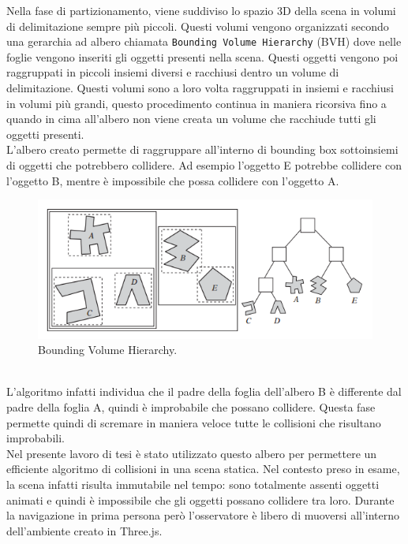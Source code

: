 Nella fase di partizionamento, viene suddiviso lo spazio 3D della scena in volumi di delimitazione sempre più piccoli. Questi volumi vengono organizzati secondo una gerarchia ad albero chiamata \texttt{Bounding Volume Hierarchy} (BVH) dove nelle foglie vengono inseriti gli oggetti presenti nella scena. 
Questi oggetti vengono poi raggruppati in piccoli insiemi diversi e racchiusi dentro un volume di delimitazione. Questi volumi sono a loro volta raggruppati in insiemi e racchiusi in volumi più grandi, questo procedimento continua in maniera ricorsiva fino a quando in cima all’albero non viene creata un volume che racchiude tutti gli oggetti presenti.
\\
L’albero creato permette di raggruppare all’interno di bounding box sottoinsiemi di oggetti che potrebbero collidere.
Ad esempio l’oggetto E potrebbe collidere con l’oggetto B, mentre è impossibile che possa collidere con l’oggetto A.
\begin{figure}[htb]
 \centering
 \includegraphics[width=1\linewidth]{images/chapter_navigazione_scena/partiz_tree.png}\hfill
 \caption[Bounding Volume Hierarchy.]{Bounding Volume Hierarchy.}
 \label{fig:navigazione_scena_partiz_tree}
\end{figure}
\\
L’algoritmo infatti individua che il padre della foglia dell’albero B è differente dal padre della foglia A, quindi è improbabile che possano collidere.
Questa fase permette quindi di scremare in maniera veloce tutte le collisioni che risultano improbabili.
\\
Nel presente lavoro di tesi è stato utilizzato questo albero per permettere un efficiente algoritmo di collisioni in una scena statica.
Nel contesto preso in esame, la scena infatti risulta immutabile nel tempo: sono totalmente assenti oggetti animati e quindi è impossibile che gli oggetti possano collidere tra loro.
Durante la navigazione in prima persona però l’osservatore è libero di muoversi all’interno dell’ambiente creato in Three.js.
